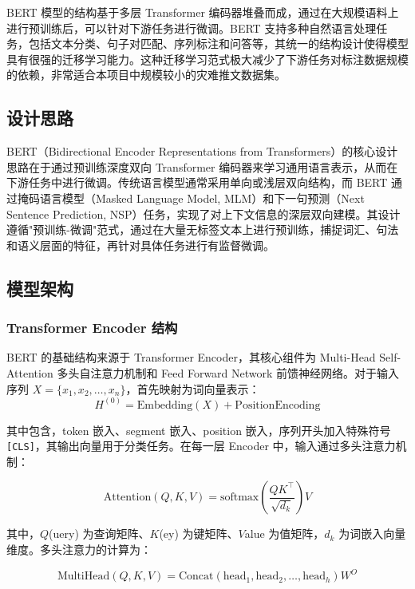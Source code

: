 \documentclass[12pt, a4paper, UTF8]{ctexart}
\begin{document}
BERT 模型的结构基于多层 Transformer 编码器堆叠而成，通过在大规模语料上进行预训练后，可以针对下游任务进行微调。BERT 支持多种自然语言处理任务，包括文本分类、句子对匹配、序列标注和问答等，其统一的结构设计使得模型具有很强的迁移学习能力。这种迁移学习范式极大减少了下游任务对标注数据规模的依赖，非常适合本项目中规模较小的灾难推文数据集。



\subsection{设计思路}
BERT（Bidirectional Encoder Representations from Transformers）的核心设计思路在于通过预训练深度双向 Transformer 编码器来学习通用语言表示，从而在下游任务中进行微调。传统语言模型通常采用单向或浅层双向结构，而 BERT 通过掩码语言模型（Masked Language Model, MLM）和下一句预测（Next Sentence Prediction, NSP）任务，实现了对上下文信息的深层双向建模。其设计遵循"预训练-微调"范式，通过在大量无标签文本上进行预训练，捕捉词汇、句法和语义层面的特征，再针对具体任务进行有监督微调。



\subsection{模型架构}
\subsubsection{Transformer Encoder 结构}\label{sec:bert-arch-transformer}
BERT 的基础结构来源于 Transformer Encoder，其核心组件为 Multi-Head Self-Attention 多头自注意力机制和 Feed Forward Network 前馈神经网络。对于输入序列 $X = \{x_1, x_2, \ldots, x_n\}$，首先映射为词向量表示：
\begin{equation}
H^{(0)} = \text{Embedding}(X) + \text{PositionEncoding}
\end{equation}

其中包含，token 嵌入、segment 嵌入、position 嵌入，序列开头加入特殊符号 \verb|[CLS]|，其输出向量用于分类任务。在每一层 Encoder 中，输入通过多头注意力机制：

\begin{equation}
\text{Attention}(Q,K,V) = \text{softmax}\left(\dfrac{\displaystyle QK^{\top}}{\displaystyle\sqrt{d_k}}\right)V
\end{equation}

其中，$Q$(uery) 为查询矩阵、$K$(ey) 为键矩阵、$V$alue 为值矩阵，$d_k$ 为词嵌入向量维度。多头注意力的计算为：

\begin{equation}
\text{MultiHead}(Q,K,V) = \text{Concat}(\text{head}_1,\text{head}_2,\ldots,\text{head}_h)W^O
\end{equation}
\end{document}
